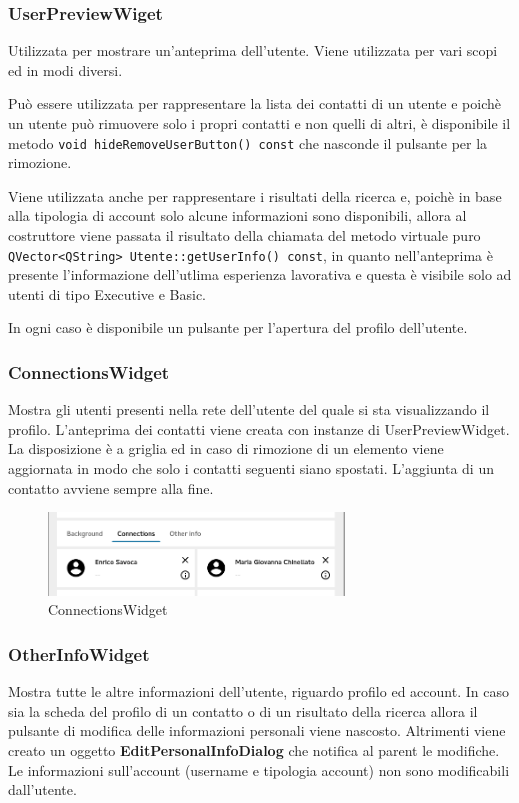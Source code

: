 \documentclass[a4paper]{article}
\begin{document}
\subsubsection*{UserPreviewWiget}
Utilizzata per mostrare un'anteprima dell'utente. Viene utilizzata per vari scopi ed in modi diversi. 

Può essere utilizzata per rappresentare la lista dei contatti di un utente e poichè un utente può rimuovere solo i propri contatti e non quelli di altri, è disponibile il metodo \texttt{void hideRemoveUserButton() const} che nasconde il pulsante per la rimozione. 

Viene utilizzata anche per rappresentare i risultati della ricerca e, poichè in base alla tipologia di account solo alcune informazioni sono disponibili, allora al costruttore viene passata il risultato della chiamata del metodo virtuale puro \texttt{QVector<QString> Utente::getUserInfo() const}, in quanto nell'anteprima è presente l'informazione dell'utlima esperienza lavorativa e questa è visibile solo ad utenti di tipo Executive e Basic.

In ogni caso è disponibile un pulsante per l'apertura del profilo dell'utente.

\subsubsection*{ConnectionsWidget}
Mostra gli utenti presenti nella rete dell'utente del quale si sta visualizzando il profilo. L'anteprima dei contatti viene creata con instanze di UserPreviewWidget. La disposizione è a griglia ed in caso di rimozione di un elemento viene aggiornata in modo che solo i contatti seguenti siano spostati. L'aggiunta di un contatto avviene sempre alla fine.

\begin{figure}[!ht]
\centering
\includegraphics[width=0.7\textwidth]{ConnectionsWidget.png}
\caption{ConnectionsWidget}
\end{figure}

\subsubsection*{OtherInfoWidget}
Mostra tutte le altre informazioni dell'utente, riguardo profilo ed account. In caso sia la scheda del profilo di un contatto o di un risultato della ricerca allora il pulsante di modifica delle informazioni personali viene nascosto. Altrimenti viene creato un oggetto \textbf{EditPersonalInfoDialog} che notifica al parent le modifiche. Le informazioni sull'account (username e tipologia account) non sono modificabili dall'utente.
\end{document}
